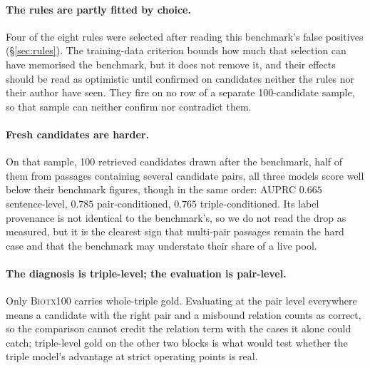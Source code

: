\documentclass[11pt]{article}
\begin{document}
\paragraph{The rules are partly fitted by choice.}
Four of the eight rules were selected after reading this benchmark's false positives
(\S\ref{sec:rules}). The training-data criterion bounds how much that selection can have memorised
the benchmark, but it does not remove it, and their effects should be read as optimistic until
confirmed on candidates neither the rules nor their author have seen. They fire on no row of a
separate 100-candidate sample, so that sample can neither confirm nor contradict them.

\paragraph{Fresh candidates are harder.}
On that sample, 100 retrieved candidates drawn after the benchmark, half of them from passages
containing several candidate pairs, all three models score well below their benchmark figures,
though in the same order: AUPRC $0.665$ sentence-level, $0.785$ pair-conditioned, $0.765$
triple-conditioned. Its label provenance is not identical to the benchmark's, so we do not read the
drop as measured, but it is the clearest sign that multi-pair passages remain the hard case and that
the benchmark may understate their share of a live pool.

\paragraph{The diagnosis is triple-level; the evaluation is pair-level.}
Only \textsc{Biotx100} carries whole-triple gold. Evaluating at the pair level everywhere means a
candidate with the right pair and a misbound relation counts as correct, so the comparison cannot
credit the relation term with the cases it alone could catch; triple-level gold on the other two
blocks is what would test whether the triple model's advantage at strict operating points is real.
\end{document}
